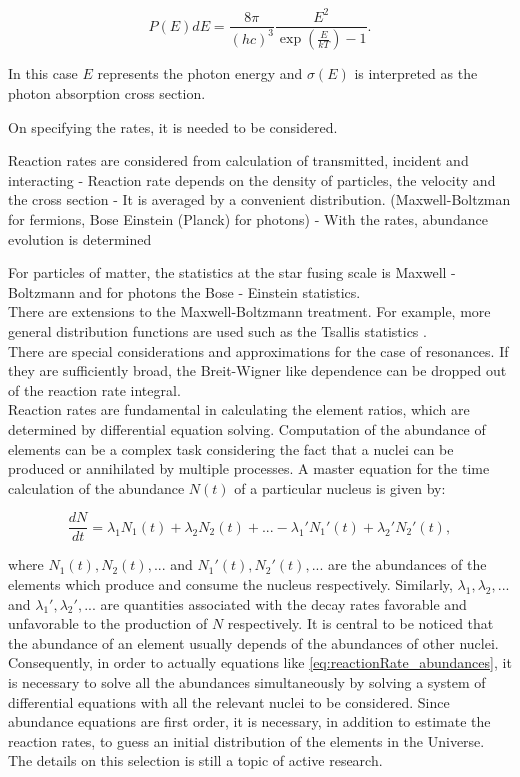 \documentclass[openany]{book}
\begin{document}
\begin{equation} \label{eq:reactionRate_boseEinstein}
	P(E)dE = \frac{8\pi}{(hc)^3} \frac{E^2}{\exp{\left(\frac{E}{kT}\right)} - 1}.
\end{equation}

In this case $E$ represents the photon energy and $\sigma(E)$ is interpreted as the photon absorption cross section.


On specifying the rates, it is needed to be considered.

Reaction rates are considered from calculation of transmitted, incident and interacting 
- Reaction rate depends on the density of particles, the velocity and the cross section
-	It is averaged by a convenient distribution. (Maxwell-Boltzman for fermions, Bose Einstein (Planck) for photons)
-	With the rates, abundance evolution is determined 

 For particles of matter, the statistics at the star fusing scale is Maxwell - Boltzmann and for photons the Bose - Einstein statistics. \\ 


There are extensions to the Maxwell-Boltzmann treatment. For example, more general distribution functions are used such as the Tsallis statistics \cite{haubold_kumar_2008}.  \\

There are special considerations and approximations for the case of resonances. If they are sufficiently broad, the Breit-Wigner like dependence can be dropped out of the reaction rate integral. \\

 Reaction rates are fundamental in calculating the element ratios, which are determined by differential equation solving. Computation of the abundance of elements can be a complex task considering the fact that a nuclei can be produced or annihilated by multiple processes. A master equation for the time calculation of the abundance $N(t)$ of a particular nucleus is given by:
 
 \begin{equation}\label{eq:reactionRate_abundances}
 	\frac{dN}{dt} = \lambda_1 N_1(t) + \lambda_2 N_2(t)  + ... -  \lambda_1' N_1'(t) + \lambda_2' N_2'(t),
 \end{equation}

where $N_1(t), N_2(t), ...$ and $N_1'(t), N_2'(t), ...$ are the abundances of the elements which produce and consume the nucleus respectively. Similarly,  $\lambda_1, \lambda_2, ...$ and  $\lambda_1', \lambda_2', ...$ are quantities associated with the decay rates favorable and unfavorable to the production of $N$ respectively. It is central to be noticed that the abundance of an element usually depends of the abundances of other nuclei. Consequently, in order to actually equations like \ref{eq:reactionRate_abundances}, it is necessary to solve all the abundances simultaneously by solving a system of differential equations with all the relevant nuclei to be considered. Since abundance equations are first order, it is necessary, in addition to estimate the reaction rates, to guess an initial distribution of the elements in the Universe. The details on this selection is still a topic of active research. \\
\end{document}
